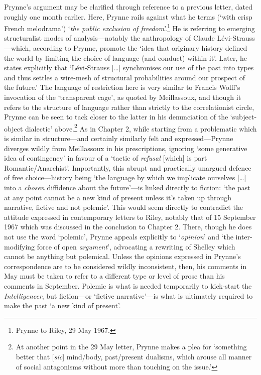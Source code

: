 \documentclass[]{article}
\begin{document}
Prynne’s argument may be clarified through reference to a previous
letter, dated roughly one month earlier. Here, Prynne rails against what
he terms (‘with crisp French melodrama’) ‘\emph{the public exclusion of
freedom}’.\footnote{Prynne to Riley, 29 May 1967.} He is referring to
emerging structuralist modes of analysis—notably the anthropology of
Claude Lévi-Strauss—which, according to Prynne, promote the ‘idea that
originary history defined the world by limiting the choice of language
(and conduct) within it’. Later, he states explicitly that ‘Lévi-Strauss
{[}\ldots{}{]} synchronises our use of the past into types and thus
settles a wire-mesh of structural probabilities around our prospect of
the future.’ The language of restriction here is very similar to Francis
Wolff’s invocation of the ‘transparent cage’, as quoted by Meillassoux,
and though it refers to the structure of language rather than strictly
to the correlationist circle, Prynne can be seen to tack closer to the
latter in his denunciation of the ‘subject-object dialectic’
above.\footnote{At another point in the 29 May letter, Prynne makes a
  plea for ‘something better that {[}\emph{sic}{]} mind/body,
  past/present dualisms, which arouse all manner of social antagonisms
  without more than touching on the issue.’} As in Chapter 2, while
starting from a problematic which is similar in structure—and certainly
similarly felt and expressed—Prynne diverges wildly from Meillassoux in
his prescriptions, ignoring ‘some generative idea of contingency’ in
favour of a ‘tactic of \emph{refusal} {[}which{]} is part
Romantic/Anarchist’. Importantly, this abrupt and practically unargued
defence of free choice—history being ‘the language by which we implicate
ourselves {[}\ldots{}{]} into a \emph{chosen} diffidence about the
future’—is linked directly to fiction: ‘the past at any point cannot be
a new kind of present unless it’s taken up through narrative, fictive
and not polemic’. This would seem directly to contradict the attitude
expressed in contemporary letters to Riley, notably that of 15 September
1967 which was discussed in the conclusion to Chapter 2. There, though
he does not use the word ‘polemic’, Prynne appeals explicitly to
‘\emph{opinion}’ and ‘the inter-modifying force of open
\emph{argument}’, advocating a rewriting of Shelley which cannot be
anything but polemical. Unless the opinions expressed in Prynne’s
correspondence are to be considered wildly inconsistent, then, his
comments in May must be taken to refer to a different type or level of
prose than his comments in September. Polemic is what is needed
temporarily to kick-start the \emph{Intelligencer}, but fiction—or
‘fictive narrative’—is what is ultimately required to make the past ‘a
new kind of present’.
\end{document}

